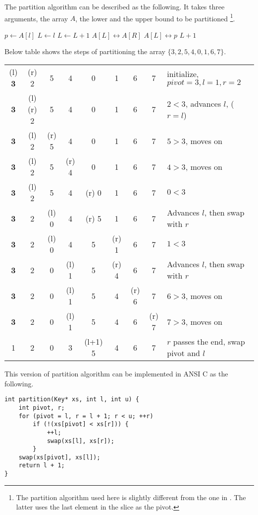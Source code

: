 \documentclass[UTF8]{article}
\begin{document}
The partition algorithm can be described as the following. It takes three arguments, the array $A$, the lower
and the upper bound to be partitioned \footnote{The partition algorithm used here is slightly different from
the one in \cite{CLRS}. The latter uses the last element in the slice as the pivot.}.

\begin{algorithmic}[1]
  \State $p \gets A[l]$  
  \State $L \gets l$ 
   
     
      \State $L \gets L + 1$
      \State {} $A[L] \leftrightarrow A[R]$
    \EndIf
  \EndFor
  \State {} $A[L] \leftrightarrow p$
  \State \Return $L + 1$ 
\EndFunction
\end{algorithmic}

Below table shows the steps of partitioning the array $\{ 3, 2, 5, 4, 0, 1, 6, 7\}$.

\begin{tabular}{ | c c c c c c c c | l |}
\hline
(l) {\bf 3} & (r) 2 & 5 & 4 & 0 & 1 & 6 & 7 & initialize, $pivot = 3, l = 1, r = 2$ \\
{\bf 3} & (l)(r) 2 & 5 & 4 & 0 & 1 & 6 & 7 & $2 < 3$, advances $l$, ($r=l$)\\
{\bf 3} & (l) 2 & (r) 5 & 4 & 0 & 1 & 6 & 7 & $5 > 3$, moves on \\
{\bf 3} & (l) 2 & 5 & (r) 4 & 0 & 1 & 6 & 7 & $4 > 3$, moves on \\
{\bf 3} & (l) 2 & 5 & 4 & (r) 0 & 1 & 6 & 7 & $0 < 3$ \\
{\bf 3} & 2 & (l) 0 & 4 & (r) 5 & 1 & 6 & 7 & Advances $l$, then swap with $r$ \\
{\bf 3} & 2 & (l) 0 & 4 & 5 & (r) 1 & 6 & 7 & $1 < 3$ \\
{\bf 3} & 2 & 0 & (l) 1 & 5 & (r) 4 & 6 & 7 & Advances $l$, then swap with $r$ \\
{\bf 3} & 2 & 0 & (l) 1 & 5 & 4 & (r) 6 & 7 & $6 > 3$, moves on \\
{\bf 3} & 2 & 0 & (l) 1 & 5 & 4 & 6 & (r) 7 & $7 > 3$, moves on \\
1 & 2 & 0 & 3 & (l+1) 5 & 4 & 6 & 7 & $r$ passes the end, swap pivot and $l$ \\
\hline
\end{tabular}

This version of partition algorithm can be implemented in ANSI C as the following.
\lstset{language=C}
\begin{lstlisting}
int partition(Key* xs, int l, int u) {
    int pivot, r;
    for (pivot = l, r = l + 1; r < u; ++r)
        if (!(xs[pivot] < xs[r])) {
            ++l;
            swap(xs[l], xs[r]);
        }
    swap(xs[pivot], xs[l]);
    return l + 1;
}
\end{lstlisting}
\end{document}
